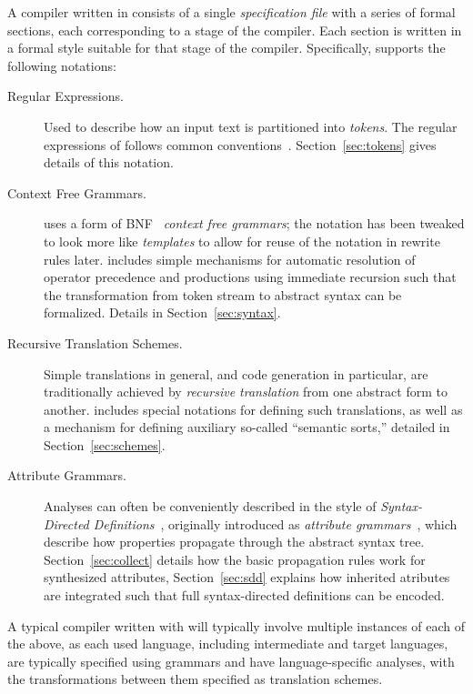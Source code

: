 \documentclass[11pt]{article} %
\begin{document}
A compiler written in \HAX consists of a single \emph{specification file} with a series of formal
sections, each corresponding to a stage of the compiler.  Each section is written in a formal style
suitable for that stage of the compiler. Specifically, \HAX supports the following notations:
\begin{description}

\item[Regular Expressions.] Used to describe how an input text is partitioned into
  \emph{tokens}. The regular expressions of \HAX follows common
  conventions~\cite{Aho+:2006}. Section~\ref{sec:tokens} gives details of this notation.

\item[Context Free Grammars.] \HAX uses a form of BNF~\cite{NaurEtal:cacm1960} \emph{context free
    grammars}; the notation has been tweaked to look more like \emph{templates} to allow for reuse
  of the notation in rewrite rules later. \HAX includes simple mechanisms for automatic resolution
  of operator precedence and productions using immediate recursion such that the transformation from
  token stream to abstract syntax can be formalized. Details in Section~\ref{sec:syntax}.

\item[Recursive Translation Schemes.] Simple translations in general, and code generation in
  particular, are traditionally achieved by \emph{recursive translation} from one abstract form to
  another.  \HAX includes special notations for defining such translations, as well as a mechanism
  for defining auxiliary so-called ``semantic sorts,'' detailed in Section~\ref{sec:schemes}.

\item[Attribute Grammars.] Analyses can often be conveniently described in the style of
  \emph{Syntax-Directed Definitions}~\cite{Aho+:2006}, originally introduced as \emph{attribute
    grammars}~\cite{Knuth:mst1968}, which describe how properties propagate through the abstract
  syntax tree.  Section~\ref{sec:collect} details how the basic propagation rules work for
  synthesized attributes, Section~\ref{sec:sdd} explains how inherited atributes are integrated such
  that full syntax-directed definitions can be encoded.


\end{description}
A typical compiler written with \HAX will typically involve multiple instances of each of the above,
as each used language, including intermediate and target languages, are typically specified using
grammars and have language-specific analyses, with the transformations between them specified as
translation schemes.
\end{document}
